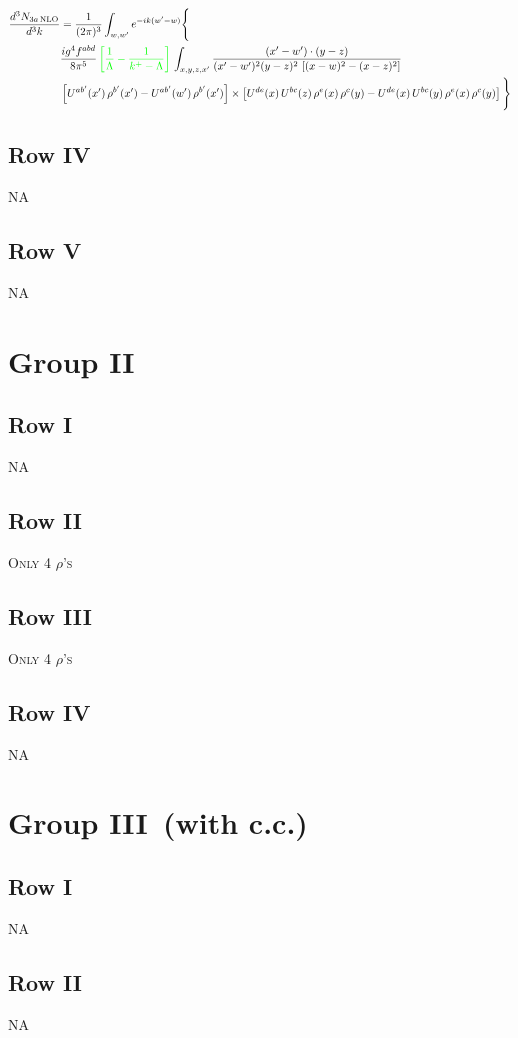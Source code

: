 \documentclass[9pt]{article}
\numberwithin{equation}{section}
\begin{document}
\begin{align}
\frac{d^{3}N_{3a\,\rm NLO}}{d^{3}k} & =\frac{1}{(2\pi)^{3}}\int_{w,w'}e^{-ik(w'-w)}\Bigg\{\notag \\ & \frac{ig^{4}f^{abd}}{8\pi^{5}}\,{\color{green}\left[\frac{1}{\Lambda}-\frac{1}{k^{+}-\Lambda}\right]}\,\int_{x,y,z,x'}
\frac{(x'-w')\cdot(y-z)}{(x'-w')^{2}(y-z)^{2}\,\left[(x-w)^{2}-(x-z)^{2}\right]}\notag \\ & \left[U^{ab'}(x')\,\rho^{b'}(x')-U^{ab'}(w')\, \rho^{b'}(x')\right]\times \left[U^{de}(x)\,U^{bc}(z)\, \rho^{e}(x)\,\rho^{c}(y)-U^{de}(x)\,U^{bc}(y)\,\rho^{e}(x)\,\rho^{c}(y)\right]\Bigg\}
\end{align}
\subsection{Row IV}
\textsc{NA}
\subsection{Row V}
\textsc{NA}
\section{Group II}
\subsection{Row I}
\textsc{NA}
\subsection{Row II}
\textsc{Only 4 $\rho$'s}
\subsection{Row III}
\textsc{Only 4 $\rho$'s}
\subsection{Row IV}
\textsc{NA}
\section{Group III\, (with c.c.)}
\subsection{Row I}
\textsc{NA}
\subsection{Row II}
\textsc{NA}
\end{document}

